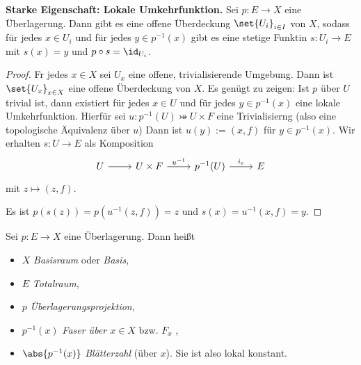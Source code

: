 \documentclass[language=ngerman]{TemplateLecture} %
\begin{document}
\textbf{Starke Eigenschaft: Lokale Umkehrfunktion.} Sei $p: E \to X$ eine Überlagerung. Dann gibt es eine offene Überdeckung $\set{U_i}_{i \in I}$ von $X$, sodass für jedes $x \in U_i$ und für jedes $y \in p^{-1}(x)$ gibt es eine stetige Funktin $s: U_i \to E$ mit $s(x) = y$ und $p \circ s = \id_{U_i}$.

\begin{proof}
    Fr jedes $x \in X$ sei $U_x$ eine offene, trivialisierende Umgebung. Dann ist $\set{U_x}_{x \in X}$ eine offene Überdeckung von $X$. Es genügt zu zeigen: Ist $p$ über $U$ trivial ist, dann existiert für jedes $x \in U$ und für jedes $y \in p^{-1}(x)$ eine lokale Umkehrfunktion. Hierfür sei $u: p^{-1}(U) \bij U \times F$ eine Trivialisierng (also eine topologische Äquivalenz über $u$) Dann ist $u(y) := (x,f)$ für $y \in p^{-1}(x)$. Wir erhalten $s: U \to E$ als Komposition
    \begin{equation*}
        \begin{tikzcd}
            U \arrow[r] & U \times F \arrow[r, "u^{-1}"] & p^{-1}(U) \arrow[r, "i_e"] & E
        \end{tikzcd}
    \end{equation*}
    mit $z \mapsto (z, f)$.

    Es ist $p(s(z)) = p(u^{-1}(z,f)) = z$ und $s(x) = u^{-1}(x, f) = y$.
\end{proof}

\begin{remark}[Vokabeln]
    Sei $p: E \to X$ eine Überlagerung. Dann heißt 
    \begin{itemize}
        \item $X$ \emph{Basisraum} oder \emph{Basis},
        \item $E$ \emph{Totalraum},
        \item $p$ \emph{Überlagerungsprojektion},
        \item $p^{-1}(x)$ \emph{Faser über $x \in X$} bzw. $F_x$ ,
        \item $\abs{p^{-1}(x)}$ \emph{Blätterzahl} (über $x$). Sie ist also lokal konstant.
    \end{itemize}
\end{remark}
\end{document}
